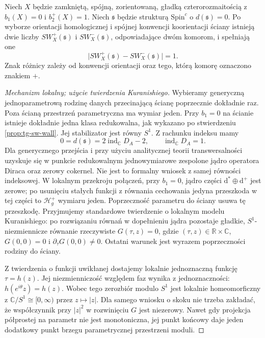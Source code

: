\begin{twierdzenie}
\label{thm:tg-sw-wallcross}
Niech $X$ będzie zamkniętą, spójną, zorientowaną,
gładką czterorozmaitością z $b_1(X)=0$ i $b_2^+(X)=1$.
Niech $\mathfrak s$ będzie strukturą $\mathrm{Spin}^c$
o $d(\mathfrak s)=0$. Po wyborze orientacji homologicznej
i spójnej konwencji koorientacji ściany istnieją dwie
liczby $SW_X^+(\mathfrak s)$ i $SW_X^-(\mathfrak s)$,
odpowiadające dwóm komorom, i spełniają one
\[
\bigl|SW_X^+(\mathfrak s)-SW_X^-(\mathfrak s)\bigr|=1.
\]
Znak różnicy zależy od konwencji orientacji oraz tego,
którą komorę oznaczono znakiem $+$.
\end{twierdzenie}

\begin{proof}[Mechanizm lokalny; użycie twierdzenia Kuranishiego]
Wybieramy generyczną jednoparametrową rodzinę danych
przecinającą ścianę poprzecznie dokładnie raz.
Poza ścianą przestrzeń parametryczna ma wymiar jeden.
Przy $b_1=0$ na ścianie istnieje dokładnie jedna
klasa redukowalna, jak wykazano po stwierdzeniu
\ref{prop:tg-sw-wall}. Jej stabilizator jest równy $S^1$. Z rachunku indeksu mamy
\[
0=d(\mathfrak s)=2\operatorname{ind}_{\mathbb C}D_A-2,
\qquad\operatorname{ind}_{\mathbb C}D_A=1.
\]
Dla generycznego przejścia i przy użyciu analitycznej
teorii transwersalności uzyskuje się w punkcie redukowalnym
jednowymiarowe zespolone jądro operatora Diraca oraz
zerowy cokernel. Nie jest to formalny wniosek z samej
równości indeksowej. W lokalnym przekroju połączeń, przy $b_1=0$,
jądro części $\mathrm d^*\oplus\mathrm d^+$
jest zerowe; po usunięciu stałych funkcji z równania
cechowania jedyna przeszkoda w tej części to
$\mathcal H_g^+$ wymiaru jeden. Poprzeczność
parametru do ściany usuwa tę przeszkodę.
Przyjmujemy standardowe twierdzenie o lokalnym
modelu Kuranishiego: po rozwiązaniu równań
w dopełnieniu jądra pozostaje gładkie,
$S^1$-niezmiennicze równanie rzeczywiste
$G(\tau,z)=0$, gdzie $(\tau,z)\in\mathbb R\times\mathbb C$,
$G(0,0)=0$ i $\partial_\tau G(0,0)\ne0$.
Ostatni warunek jest wyrazem poprzeczności
rodziny do ściany.

Z twierdzenia o funkcji uwikłanej dostajemy
lokalnie jednoznaczną funkcję $\tau=h(z)$.
Jej niezmienniczość względem faz wynika
z jednoznaczności: $h(e^{i\theta}z)=h(z)$.
Wobec tego zerozbiór modulo $S^1$ jest
lokalnie homeomorficzny z
$\mathbb C/S^1\cong[0,\infty)$ przez
$z\mapsto |z|$.
Dla samego wniosku o skoku nie trzeba
zakładać, że współczynnik przy $|z|^2$
w rozwinięciu $G$ jest niezerowy.
Nawet gdy projekcja półprostej na parametr
nie jest monotoniczna, jej punkt końcowy
daje jeden dodatkowy punkt brzegu
parametrycznej przestrzeni moduli.


\end{proof}
